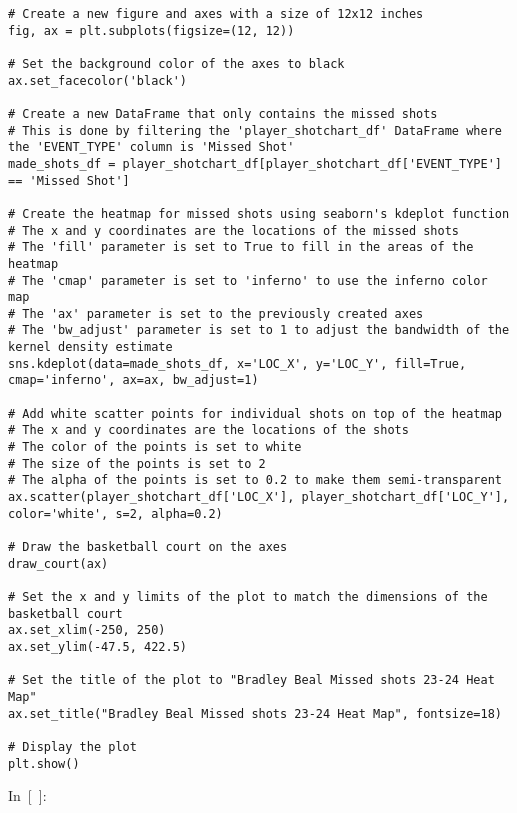 \begin{verbatim}
# Create a new figure and axes with a size of 12x12 inches
fig, ax = plt.subplots(figsize=(12, 12))

# Set the background color of the axes to black
ax.set_facecolor('black')

# Create a new DataFrame that only contains the missed shots
# This is done by filtering the 'player_shotchart_df' DataFrame where the 'EVENT_TYPE' column is 'Missed Shot'
made_shots_df = player_shotchart_df[player_shotchart_df['EVENT_TYPE'] == 'Missed Shot']

# Create the heatmap for missed shots using seaborn's kdeplot function
# The x and y coordinates are the locations of the missed shots
# The 'fill' parameter is set to True to fill in the areas of the heatmap
# The 'cmap' parameter is set to 'inferno' to use the inferno color map
# The 'ax' parameter is set to the previously created axes
# The 'bw_adjust' parameter is set to 1 to adjust the bandwidth of the kernel density estimate
sns.kdeplot(data=made_shots_df, x='LOC_X', y='LOC_Y', fill=True, cmap='inferno', ax=ax, bw_adjust=1)

# Add white scatter points for individual shots on top of the heatmap
# The x and y coordinates are the locations of the shots
# The color of the points is set to white
# The size of the points is set to 2
# The alpha of the points is set to 0.2 to make them semi-transparent
ax.scatter(player_shotchart_df['LOC_X'], player_shotchart_df['LOC_Y'], color='white', s=2, alpha=0.2)

# Draw the basketball court on the axes
draw_court(ax)

# Set the x and y limits of the plot to match the dimensions of the basketball court
ax.set_xlim(-250, 250)
ax.set_ylim(-47.5, 422.5)

# Set the title of the plot to "Bradley Beal Missed shots 23-24 Heat Map"
ax.set_title("Bradley Beal Missed shots 23-24 Heat Map", fontsize=18)

# Display the plot
plt.show()
\end{verbatim}

In~{[}~{]}:

